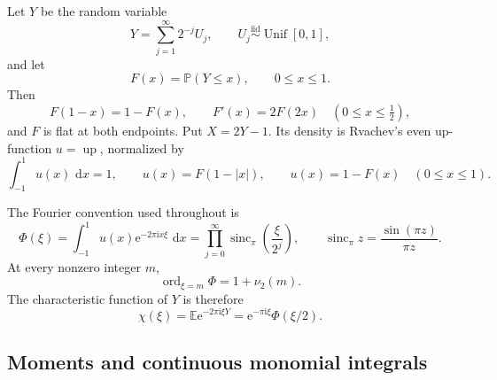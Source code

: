 \documentclass[11pt,oneside]{article}
\numberwithin{equation}{section}
\theoremstyle{definition}
\theoremstyle{remark}
\newcommand{\E}{\mathbb E}
\newcommand{\Prob}{\mathbb P}
\newcommand{\dd}{\,\mathrm d}
\newcommand{\e}{\mathrm e}
\newcommand{\ii}{\mathrm i}
\newcommand{\Up}{\operatorname{up}}
\newcommand{\sincpi}{\operatorname{sinc}_{\pi}}
\newcommand{\vtwo}{\nu_2}
\begin{document}
Let \(Y\) be the random variable
\begin{equation}
 Y=\sum_{j=1}^{\infty}2^{-j}U_j,
 \qquad U_j\stackrel{\mathrm{iid}}{\sim}\operatorname{Unif}[0,1],
 \label{eq:Y-law}
\end{equation}
and let
\[
 F(x)=\Prob(Y\le x),\qquad 0\le x\le1.
\]
Then
\begin{equation}
 F(1-x)=1-F(x),
 \qquad F'(x)=2F(2x)\quad(0\le x\le\tfrac12),
 \label{eq:F-basic}
\end{equation}
and \(F\) is flat at both endpoints.  Put \(X=2Y-1\).  Its density is Rvachev's
even up-function \(u=\Up\), normalized by
\begin{equation}
 \int_{-1}^{1}u(x)\,\dd x=1,
 \qquad
 u(x)=F(1-|x|),
 \qquad
 u(x)=1-F(x)\quad(0\le x\le1).
 \label{eq:up-fold}
\end{equation}

The Fourier convention used throughout is
\begin{equation}
 \Phi(\xi)=\int_{-1}^{1}u(x)\e^{-2\pi\ii x\xi}\,\dd x
 =\prod_{j=0}^{\infty}\sincpi\!\left(\frac{\xi}{2^j}\right),
 \qquad \sincpi z=\frac{\sin(\pi z)}{\pi z}.
 \label{eq:Phi-product}
\end{equation}
At every nonzero integer \(m\),
\begin{equation}
 \operatorname{ord}_{\xi=m}\Phi=1+\vtwo(m).
 \label{eq:Phi-zero-order}
\end{equation}
The characteristic function of \(Y\) is therefore
\begin{equation}
 \chi(\xi)=\E\e^{-2\pi\ii\xi Y}
 =\e^{-\pi\ii\xi}\Phi(\xi/2).
 \label{eq:chi-Phi}
\end{equation}

\subsection{Moments and continuous monomial integrals}
\end{document}
